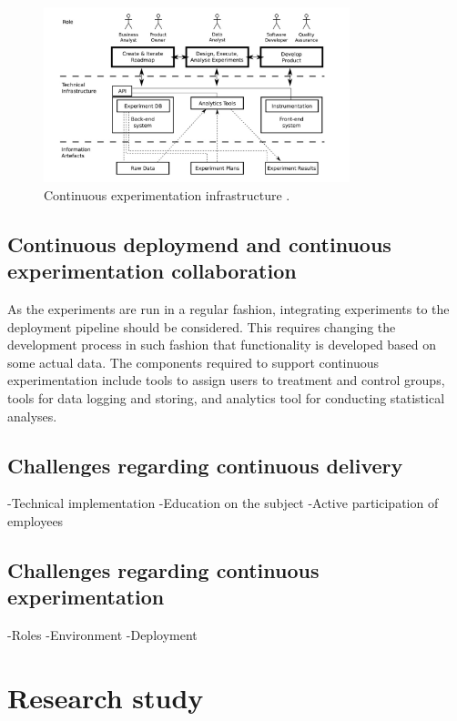 \documentclass[english]{tktltiki2}
\theoremstyle{definition}
\theoremstyle{remark}
\begin{document}

\begin{figure}[H]
	\centering
	\includegraphics[width=3.5in]{infra.jpg}
	\caption{Continuous experimentation infrastructure \cite{fagerholm2014building}.}
	\label{fig4}
\end{figure}

\subsection{Continuous deploymend and continuous experimentation collaboration}
As the experiments are run in a regular fashion, integrating experiments to the deployment pipeline should be considered. This requires changing the development process in such fashion that functionality is developed based on some actual data. The components required to support continuous experimentation include tools to assign users to treatment and control groups, tools for data logging and storing, and analytics tool for conducting statistical analyses.

\subsection{Challenges regarding continuous delivery}
-Technical implementation
-Education on the subject
-Active participation of employees

\subsection{Challenges regarding continuous experimentation}
-Roles
-Environment
-Deployment

\section{Research study}
\end{document}

